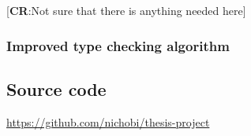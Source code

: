 \documentclass[nofilelist]{cslthse-msc}
\newcommand{\CR}[1]{\textcolor{green!60!black}{[\textbf{CR}:#1]}}
\begin{document}
\CR{Not sure that there is anything needed here}

\subsection{Improved type checking algorithm}


{} %

\begin{appendices} %
\chapter{Source code}
\url{https://github.com/nichobi/thesis-project}

\printfilelist

\checkoddpage
\ifoddpage
\else
  \newpage
  \thispagestyle{empty}
  \mbox{ }
\fi

\end{appendices}
\end{document}
